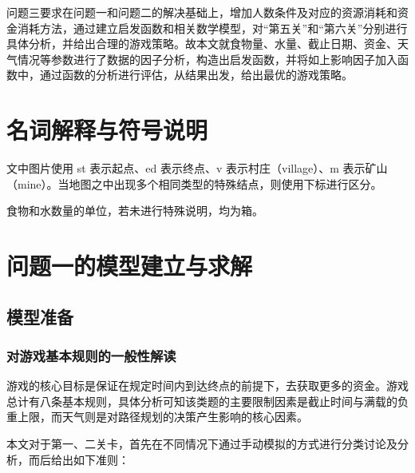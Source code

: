 \documentclass[a4paper]{ctexart}
\begin{document}
问题三要求在问题一和问题二的解决基础上，增加人数条件及对应的资源消耗和资金消耗方法，通过建立启发函数和相关数学模型，对“第五关”和“第六关”分别进行具体分析，并给出合理的游戏策略。故本文就食物量、水量、截止日期、资金、天气情况等参数进行了数据的因子分析，构造出启发函数，并将如上影响因子加入函数中，通过函数的分析进行评估，从结果出发，给出最优的游戏策略。

\section{名词解释与符号说明}

文中图片使用 st 表示起点、ed 表示终点、v 表示村庄（village）、m 表示矿山（mine）。当地图之中出现多个相同类型的特殊结点，则使用下标进行区分。

食物和水数量的单位，若未进行特殊说明，均为箱。

\section{问题一的模型建立与求解}

\subsection{模型准备}
\subsubsection{对游戏基本规则的一般性解读}

游戏的核心目标是保证在规定时间内到达终点的前提下，去获取更多的资金。游戏总计有八条基本规则，具体分析可知该类题的主要限制因素是截止时间与满载的负重上限，而天气则是对路径规划的决策产生影响的核心因素。

本文对于第一、二关卡，首先在不同情况下通过手动模拟的方式进行分类讨论及分析，而后给出如下准则：
\end{document}
